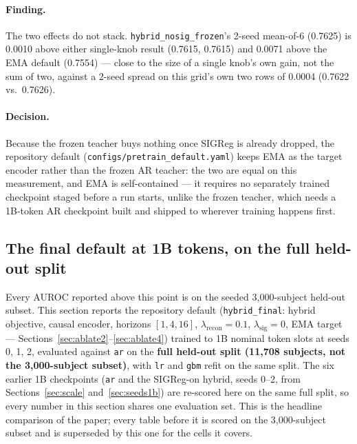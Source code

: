 \documentclass[11pt,a4paper]{article}
\newcommand{\code}[1]{\texttt{\small #1}}
\begin{document}
\paragraph{Finding.} The two effects do not stack.
\code{hybrid\_nosig\_frozen}'s 2-seed mean-of-6 (0.7625) is 0.0010 above
either single-knob result (0.7615, 0.7615) and 0.0071 above the EMA default
(0.7554) --- close to the size of a single knob's own gain, not the sum of
two, against a 2-seed spread on this grid's own two rows of 0.0004 (0.7622
vs.\ 0.7626).

\paragraph{Decision.} Because the frozen teacher buys nothing once SIGReg is
already dropped, the repository default (\code{configs/pretrain\_default.yaml})
keeps EMA as the target encoder rather than the frozen AR teacher: the two
are equal on this measurement, and EMA is self-contained --- it requires no
separately trained checkpoint staged before a run starts, unlike the frozen
teacher, which needs a 1B-token AR checkpoint built and shipped to wherever
training happens first.

\subsection{The final default at 1B tokens, on the full held-out split}
\label{sec:final1b}

Every AUROC reported above this point is on the seeded 3{,}000-subject
held-out subset. This section reports the repository default
(\code{hybrid\_final}: hybrid objective, causal encoder, horizons
$[1,4,16]$, $\lambda_{\mathrm{recon}} = 0.1$, $\lambda_{\mathrm{sig}} = 0$,
EMA target --- Sections~\ref{sec:ablate2}--\ref{sec:ablate4}) trained to 1B
nominal token slots at seeds 0, 1, 2, evaluated against \code{ar} on the
\textbf{full held-out split (11{,}708 subjects, not the 3{,}000-subject
subset)}, with \code{lr} and \code{gbm} refit on the same split. The six
earlier 1B checkpoints (\code{ar} and the SIGReg-on hybrid, seeds 0--2, from
Sections~\ref{sec:scale} and~\ref{sec:seeds1b}) are re-scored here on the
same full split, so every number in this section shares one evaluation set.
This is the headline comparison of the paper; every table before it is
scored on the 3{,}000-subject subset and is superseded by this one for the
cells it covers.
\end{document}
